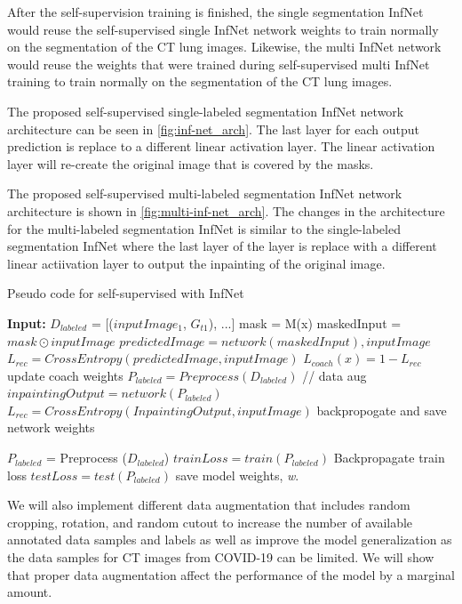 After the self-supervision training is finished, the single segmentation InfNet would reuse the self-supervised single InfNet network weights to train normally on the segmentation of the CT lung images. Likewise, the multi InfNet network would reuse the weights that were trained during self-supervised multi InfNet training to train normally on the segmentation of the CT lung images.

The proposed self-supervised single-labeled segmentation InfNet network architecture can be seen in \ref{fig:inf-net_arch}. The last layer for each output prediction is replace to a different linear activation layer. The linear activation layer will re-create the original image that is covered by the masks. 

The proposed self-supervised multi-labeled segmentation InfNet network architecture is shown in \ref{fig:multi-inf-net_arch}. The changes in the architecture for the multi-labeled segmentation InfNet is similar to the single-labeled segmentation InfNet where the last layer of the layer is replace with a different linear actiivation layer to output the inpainting of the original image. 


\begin{algorithm}
	\caption{Pseudo code for self-supervised with InfNet}
	\label{alg:self-inf-net}
	\begin{algorithmic}
		\STATE \textbf{Input:} $D_{labeled}$ = [($inputImage_1$, $G_{t1}$), ...]
		\STATE mask = M(x)
		\STATE maskedInput = $mask \odot inputImage$
		\STATE $ predictedImage =network(maskedInput), inputImage$
		\STATE $L_{rec} = CrossEntropy(predictedImage, inputImage)$
		\STATE $L_{coach}(x) = 1 - L_{rec}$
		\STATE update coach weights
		\ENDFOR
		\STATE $P_{labeled} = Preprocess(D_{labeled})$ // data aug
		\STATE $inpaintingOutput = network(P_{labeled})$
		\STATE $L_{rec} = CrossEntropy(InpaintingOutput, inputImage)$
		\STATE backpropogate and save network weights
		\ENDFOR
		\ENDFOR 
		
		
		\STATE $P_{labeled}$ = Preprocess ($D_{labeled}$)
		\STATE $trainLoss = train(P_{labeled})$
		\STATE Backpropagate train loss
		\STATE $testLoss = test(P_{labeled})$
		\STATE save model weights, \textit{w}.
		\ENDFOR
	\end{algorithmic}
\end{algorithm}

We will also implement different data augmentation that includes random cropping, rotation, and random cutout to increase the number of available annotated data samples and labels as well as improve the model generalization as the data samples for CT images from COVID-19 can be limited. We will show that proper data augmentation affect the performance of the model by a marginal amount.

